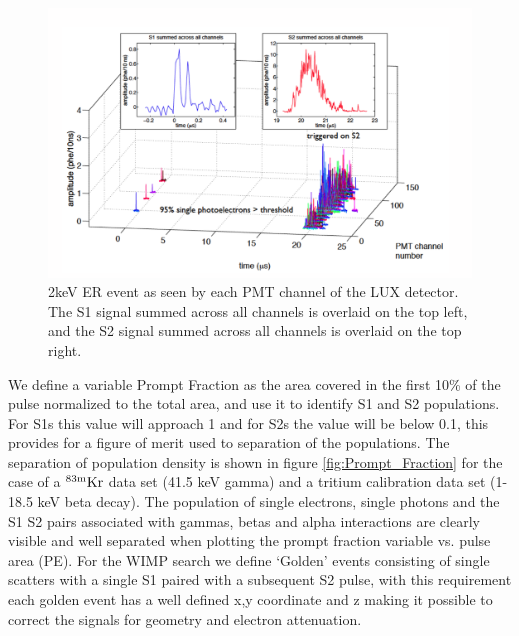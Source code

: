 
 \begin{figure}[h!]\centering
\includegraphics[width=130mm]{Chapter_LUX_Det/LUX_Golden_Event_2keV.png}
\caption{ 2keV ER event as seen by each PMT channel of the LUX detector. The S1 signal summed across all channels is overlaid on the top left, and the S2 signal summed across all channels is overlaid on the top right.}
\label{fig:LUX_Golden}
\end{figure}

We define a variable Prompt Fraction as the area covered in the first 10\% of the pulse normalized to the total area, and use it to identify S1 and S2 populations. For S1s this value will approach 1 and for S2s the value will be below 0.1, this provides for a figure of merit used to separation of the populations. The separation of population density is shown in figure \ref{fig:Prompt_Fraction} for the case of a $\rm ^{83m}Kr$ data set (41.5 keV gamma) and a tritium calibration data set (1-18.5 keV beta decay). The population of single electrons, single photons and the S1 S2 pairs associated with gammas, betas and alpha interactions are clearly visible and well separated when plotting the prompt  fraction variable vs. pulse area (PE). For the WIMP search we define `Golden' events consisting of single scatters with a single S1 paired with a subsequent S2 pulse, with this requirement each golden event has a well defined x,y coordinate and z making it possible to correct the signals for geometry and electron attenuation.

